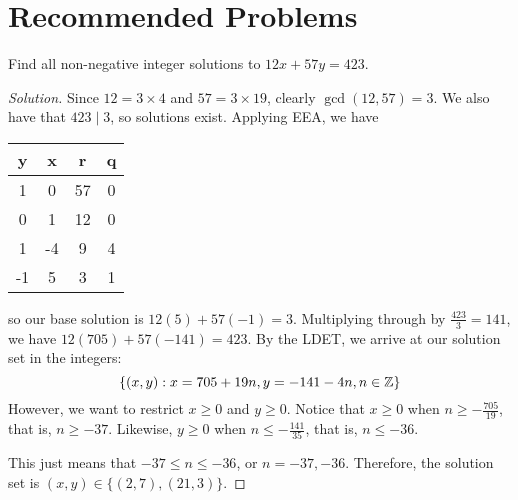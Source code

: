 \section{Recommended Problems}

\begin{recommended}
  Find all non-negative integer solutions to $12x+57y=423$.
\end{recommended}
\begin{proof}[Solution]
  Since $12 = 3\times4$ and $57=3\times19$, clearly $\gcd(12,57)=3$.
  We also have that $423 \mid 3$, so solutions exist.
  Applying EEA, we have
  \begin{center}
    \begin{tabular}{C|C|C|C}
      y  & x  & r  & q \\   & 0  & 57 & 0 \\
      0  & 1  & 12 & 0 \\
      1  & -4 & 9  & 4 \\
      -1 & 5  & 3  & 1
    \end{tabular}
  \end{center}
  so our base solution is $12(5)+57(-1)=3$.
  Multiplying through by $\frac{423}{3}=141$, we have $12(705)+57(-141)=423$.
  By the LDET, we arrive at our solution set in the integers:
  \begin{equation*}
    \{ (x,y) : x = 705 + 19n, y = -141 - 4n, n\in\mathbb{Z} \}
  \end{equation*}
  However, we want to restrict $x \geq 0$ and $y \geq 0$.
  Notice that $x \geq 0$ when $n \geq -\frac{705}{19}$, that is, $n \geq -37$.
  Likewise, $y \geq 0$ when $n \leq -\frac{141}{35}$, that is, $n \leq -36$.

  This just means that $-37 \leq n \leq -36$, or $n=-37,-36$.
  Therefore, the solution set is $(x,y)\in\{(2,7),(21,3)\}$.
\end{proof}


